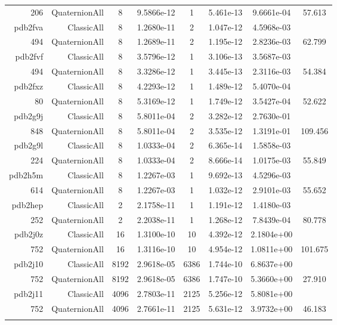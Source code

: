 \begin{xltabular}{\textwidth}{r|rcS[table-format=1.4e+2]cS[table-format=1.3e+2]S[table-format=1.4e+2]S[table-format=-1.3]}
206 & QuaternionAll & 8 & 9.5866e-12 & 1 & 5.461e-13 & 9.6661e-04 & 57.613\\  \addlinespace
pdb2fva & ClassicAll & 8 & 1.2680e-11 & 2 & 1.047e-12 & 4.5968e-03 & \\
494 & QuaternionAll & 8 & 1.2689e-11 & 2 & 1.195e-12 & 2.8236e-03 & 62.799\\  \addlinespace
pdb2fvf & ClassicAll & 8 & 3.5796e-12 & 1 & 3.106e-13 & 3.5687e-03 & \\
494 & QuaternionAll & 8 & 3.3286e-12 & 1 & 3.445e-13 & 2.3116e-03 & 54.384\\  \addlinespace
pdb2fxz & ClassicAll & 8 & 4.2293e-12 & 1 & 1.489e-12 & 5.4070e-04 & \\
80 & QuaternionAll & 8 & 5.3169e-12 & 1 & 1.749e-12 & 3.5427e-04 & 52.622\\  \addlinespace
pdb2g9j & ClassicAll & 8 & 5.8011e-04 & 2 & 3.282e-12 & 2.7630e-01 & \\
848 & QuaternionAll & 8 & 5.8011e-04 & 2 & 3.535e-12 & 1.3191e-01 & 109.456\\  \addlinespace
pdb2g9l & ClassicAll & 8 & 1.0333e-04 & 2 & 6.365e-14 & 1.5858e-03 & \\
224 & QuaternionAll & 8 & 1.0333e-04 & 2 & 8.666e-14 & 1.0175e-03 & 55.849\\  \addlinespace
pdb2h5m & ClassicAll & 8 & 1.2267e-03 & 1 & 9.692e-13 & 4.5296e-03 & \\
614 & QuaternionAll & 8 & 1.2267e-03 & 1 & 1.032e-12 & 2.9101e-03 & 55.652\\  \addlinespace
pdb2hep & ClassicAll & 2 & 2.1758e-11 & 1 & 1.191e-12 & 1.4180e-03 & \\
252 & QuaternionAll & 2 & 2.2038e-11 & 1 & 1.268e-12 & 7.8439e-04 & 80.778\\  \addlinespace
pdb2j0z & ClassicAll & 16 & 1.3100e-10 & 10 & 4.392e-12 & 2.1804e+00 & \\
752 & QuaternionAll & 16 & 1.3116e-10 & 10 & 4.954e-12 & 1.0811e+00 & 101.675\\  \addlinespace
pdb2j10 & ClassicAll & 8192 & 2.9618e-05 & 6386 & 1.744e-10 & 6.8637e+00 & \\
752 & QuaternionAll & 8192 & 2.9618e-05 & 6386 & 1.747e-10 & 5.3660e+00 & 27.910\\  \addlinespace
pdb2j11 & ClassicAll & 4096 & 2.7803e-11 & 2125 & 5.256e-12 & 5.8081e+00 & \\
752 & QuaternionAll & 4096 & 2.7661e-11 & 2125 & 5.631e-12 & 3.9732e+00 & 46.183\\  \addlinespace

\end{xltabular}
